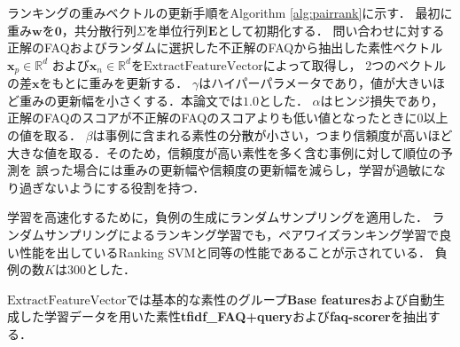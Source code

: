 \documentclass[japanese]{jnlp_1.4}
\begin{document}
ランキングの重みベクトルの更新手順をAlgorithm \ref{alg:pairrank}に示す．
最初に重み$\mathbf{w}$を$\mathbf{0}$，共分散行列$\Sigma$を単位行列$\mathbf{E}$として初期化する．
問い合わせに対する正解のFAQおよびランダムに選択した不正解のFAQから抽出した素性ベクトル$\textbf{x}_p \in \mathbb{R}^d$
および$\textbf{x}_n \in \mathbb{R}^d$を$\textrm{ExtractFeatureVector}$によって取得し，
2つのベクトルの差$\textbf{x}$をもとに重みを更新する．
$\gamma$はハイパーパラメータであり，値が大きいほど重みの更新幅を小さくする．本論文では$1.0$とした．
$\alpha$はヒンジ損失であり，正解のFAQのスコアが不正解のFAQのスコアよりも低い値となったときに$0$以上の値を取る．
$\beta$は事例に含まれる素性の分散が小さい，つまり信頼度が高いほど大きな値を取る．そのため，信頼度が高い素性を多く含む事例に対して順位の予測を
誤った場合には重みの更新幅や信頼度の更新幅を減らし，学習が過敏になり過ぎないようにする役割を持つ．

学習を高速化するために，負例の生成にランダムサンプリングを適用した．
ランダムサンプリングによるランキング学習でも，ペアワイズランキング学習で良い性能を出しているRanking SVM\cite{joachims:02}と同等の性能であることが示されている\cite{sculley:09}．
負例の数$K$は$300$とした．

$\textrm{ExtractFeatureVector}$では基本的な素性のグループ\textbf{Base features}および自動生成した学習データを用いた素性\textbf{tfidf\_FAQ+query}および\textbf{faq-scorer}を抽出する．
\end{document}
